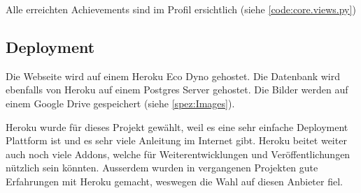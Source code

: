 Alle erreichten Achievements sind im Profil ersichtlich (siehe \ref{code:core.views.py})

\subsection{Deployment}\label{spez:Deployment}

Die Webseite wird auf einem Heroku Eco Dyno gehostet. Die Datenbank wird ebenfalls
von Heroku auf einem Postgres Server gehostet. Die Bilder werden auf einem
Google Drive gespeichert (siehe \ref{spez:Images}).

Heroku wurde für dieses Projekt gewählt, weil es eine sehr einfache
 Deployment Plattform ist und es sehr viele Anleitung im Internet
gibt. Heroku beitet weiter auch noch viele Addons, welche für
Weiterentwicklungen und Veröffentlichungen nützlich sein könnten. Ausserdem
wurden in vergangenen Projekten gute Erfahrungen mit Heroku gemacht, weswegen
die Wahl auf diesen Anbieter fiel.
